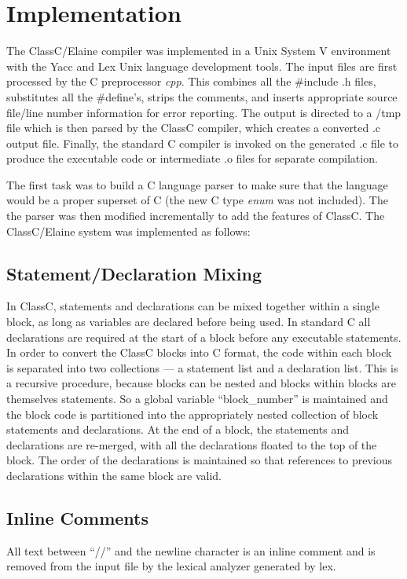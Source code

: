 \section{Implementation}
The ClassC/Elaine compiler was implemented in a Unix System V environment
with the Yacc and Lex Unix language development tools.  The input files are
first processed by the C preprocessor
{\em cpp}.
This combines all the \#include .h files, substitutes all the \#define's,
strips the comments, and inserts appropriate source file/line number
information for error reporting.  The output is directed to a /tmp file which is
then parsed by the ClassC compiler, which creates a converted .c output
file.  Finally, the standard C compiler is invoked on the generated .c file
to produce the executable code or intermediate .o files for separate
compilation.

The first task was
to build a C language parser to make sure that the language would be a
proper superset of C  (the new C type
{\em enum}
was not included).  The the parser was then modified incrementally to add
the features of ClassC.  The ClassC/Elaine system was implemented as
follows:

\subsection{Statement/Declaration Mixing}
In ClassC, statements and declarations can be mixed together within a single
block, as long as variables are declared before being used.  In standard C
all declarations are required at the start of a block before any executable
statements.  In order to convert the ClassC blocks into C format, the code
within each block is separated into two collections --- a statement list and
a declaration list.  This is a recursive procedure, because blocks can be
nested and blocks within blocks are themselves statements.  So a global
variable ``block\_number'' is maintained and the block code is partitioned into
the appropriately nested collection of block statements and declarations.  At
the end of a block, the statements and declarations are re-merged, with all
the declarations floated to the top of the block.  The order of the
declarations is maintained so that references to previous declarations
within the same block are valid.
\subsection{Inline Comments}
All text between ``//'' and the newline character is an inline comment and
is removed from the input file by the lexical analyzer generated by lex.
